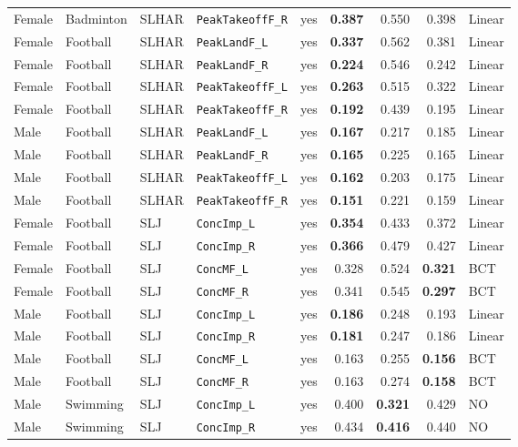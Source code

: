{\begin{longtable}{lllllrrrl}
Female & Badminton & SLHAR & \texttt{PeakTakeoffF\_R} & yes & \textbf{0.387} & 0.550 & 0.398 & Linear \\
Female & Football & SLHAR & \texttt{PeakLandF\_L} & yes & \textbf{0.337} & 0.562 & 0.381 & Linear \\
Female & Football & SLHAR & \texttt{PeakLandF\_R} & yes & \textbf{0.224} & 0.546 & 0.242 & Linear \\
Female & Football & SLHAR & \texttt{PeakTakeoffF\_L} & yes & \textbf{0.263} & 0.515 & 0.322 & Linear \\
Female & Football & SLHAR & \texttt{PeakTakeoffF\_R} & yes & \textbf{0.192} & 0.439 & 0.195 & Linear \\
Male & Football & SLHAR & \texttt{PeakLandF\_L} & yes & \textbf{0.167} & 0.217 & 0.185 & Linear \\
Male & Football & SLHAR & \texttt{PeakLandF\_R} & yes & \textbf{0.165} & 0.225 & 0.165 & Linear \\
Male & Football & SLHAR & \texttt{PeakTakeoffF\_L} & yes & \textbf{0.162} & 0.203 & 0.175 & Linear \\
Male & Football & SLHAR & \texttt{PeakTakeoffF\_R} & yes & \textbf{0.151} & 0.221 & 0.159 & Linear \\
\addlinespace[1pt]
Female & Football & SLJ & \texttt{ConcImp\_L} & yes & \textbf{0.354} & 0.433 & 0.372 & Linear \\
Female & Football & SLJ & \texttt{ConcImp\_R} & yes & \textbf{0.366} & 0.479 & 0.427 & Linear \\
Female & Football & SLJ & \texttt{ConcMF\_L} & yes & 0.328 & 0.524 & \textbf{0.321} & BCT \\
Female & Football & SLJ & \texttt{ConcMF\_R} & yes & 0.341 & 0.545 & \textbf{0.297} & BCT \\
Male & Football & SLJ & \texttt{ConcImp\_L} & yes & \textbf{0.186} & 0.248 & 0.193 & Linear \\
Male & Football & SLJ & \texttt{ConcImp\_R} & yes & \textbf{0.181} & 0.247 & 0.186 & Linear \\
Male & Football & SLJ & \texttt{ConcMF\_L} & yes & 0.163 & 0.255 & \textbf{0.156} & BCT \\
Male & Football & SLJ & \texttt{ConcMF\_R} & yes & 0.163 & 0.274 & \textbf{0.158} & BCT \\
Male & Swimming & SLJ & \texttt{ConcImp\_L} & yes & 0.400 & \textbf{0.321} & 0.429 & NO \\
Male & Swimming & SLJ & \texttt{ConcImp\_R} & yes & 0.434 & \textbf{0.416} & 0.440 & NO \\

\end{longtable}}

